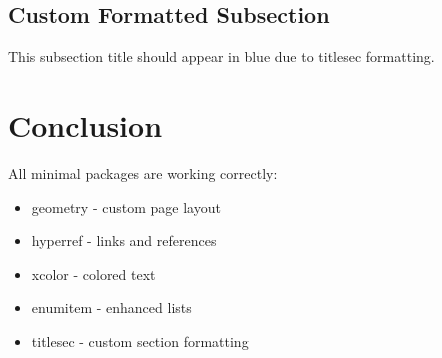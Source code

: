 \documentclass{article}
\begin{document}
    \subsection{Custom Formatted Subsection}
    This subsection title should appear in blue due to titlesec formatting.

    \section{Conclusion}
    All minimal packages are working correctly:
    \begin{itemize}
        \item \textcolor{green}{\checkmark} geometry - custom page layout
        \item \textcolor{green}{\checkmark} hyperref - links and references
        \item \textcolor{green}{\checkmark} xcolor - colored text
        \item \textcolor{green}{\checkmark} enumitem - enhanced lists
        \item \textcolor{green}{\checkmark} titlesec - custom section formatting
    \end{itemize}
\end{document}
